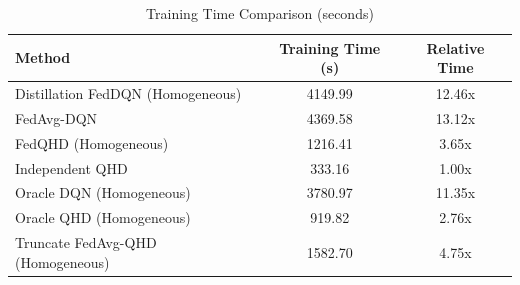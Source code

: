 \begin{table}[t]
\centering
\caption{Training Time Comparison (seconds)}
\label{tab:computation_cost}
\begin{tabular}{lcc}
\toprule
Method & Training Time (s) & Relative Time \\
\midrule
Distillation FedDQN (Homogeneous) & 4149.99 & 12.46x \\
FedAvg-DQN & 4369.58 & 13.12x \\
FedQHD (Homogeneous) & 1216.41 & 3.65x \\
Independent QHD & 333.16 & 1.00x \\
Oracle DQN (Homogeneous) & 3780.97 & 11.35x \\
Oracle QHD (Homogeneous) & 919.82 & 2.76x \\
Truncate FedAvg-QHD (Homogeneous) & 1582.70 & 4.75x \\
\bottomrule
\end{tabular}
\end{table}